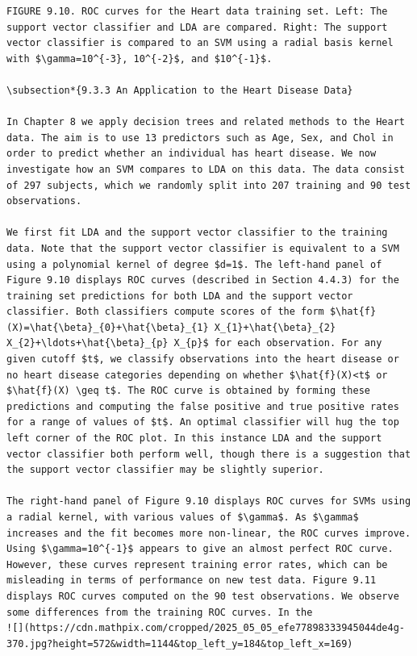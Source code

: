 \documentclass[10pt]{article}
\begin{document}
\begin{verbatim}
FIGURE 9.10. ROC curves for the Heart data training set. Left: The support vector classifier and LDA are compared. Right: The support vector classifier is compared to an SVM using a radial basis kernel with $\gamma=10^{-3}, 10^{-2}$, and $10^{-1}$.

\subsection*{9.3.3 An Application to the Heart Disease Data}

In Chapter 8 we apply decision trees and related methods to the Heart data. The aim is to use 13 predictors such as Age, Sex, and Chol in order to predict whether an individual has heart disease. We now investigate how an SVM compares to LDA on this data. The data consist of 297 subjects, which we randomly split into 207 training and 90 test observations.

We first fit LDA and the support vector classifier to the training data. Note that the support vector classifier is equivalent to a SVM using a polynomial kernel of degree $d=1$. The left-hand panel of Figure 9.10 displays ROC curves (described in Section 4.4.3) for the training set predictions for both LDA and the support vector classifier. Both classifiers compute scores of the form $\hat{f}(X)=\hat{\beta}_{0}+\hat{\beta}_{1} X_{1}+\hat{\beta}_{2} X_{2}+\ldots+\hat{\beta}_{p} X_{p}$ for each observation. For any given cutoff $t$, we classify observations into the heart disease or no heart disease categories depending on whether $\hat{f}(X)<t$ or $\hat{f}(X) \geq t$. The ROC curve is obtained by forming these predictions and computing the false positive and true positive rates for a range of values of $t$. An optimal classifier will hug the top left corner of the ROC plot. In this instance LDA and the support vector classifier both perform well, though there is a suggestion that the support vector classifier may be slightly superior.

The right-hand panel of Figure 9.10 displays ROC curves for SVMs using a radial kernel, with various values of $\gamma$. As $\gamma$ increases and the fit becomes more non-linear, the ROC curves improve. Using $\gamma=10^{-1}$ appears to give an almost perfect ROC curve. However, these curves represent training error rates, which can be misleading in terms of performance on new test data. Figure 9.11 displays ROC curves computed on the 90 test observations. We observe some differences from the training ROC curves. In the
![](https://cdn.mathpix.com/cropped/2025_05_05_efe77898333945044de4g-370.jpg?height=572&width=1144&top_left_y=184&top_left_x=169)


\end{verbatim}
\end{document}
